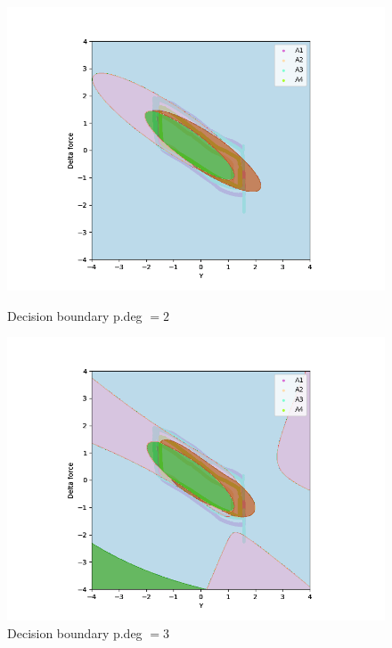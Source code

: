 \begin{figure}[]
\begin{minipage}[b]{0.5\linewidth}
                    \includegraphics[width = 1\textwidth]{figures/analysis/logistic_regression/Logistic_Regression_degree2.png}
                    \caption*{Decision boundary p.deg $= 2$}
                \end{minipage}
                \hfill
                \begin{minipage}[b]{0.5\linewidth}
                    \centering
                    \includegraphics[width = 1\textwidth]{figures/analysis/logistic_regression/Logistic_Regression_degree3.png}
                    \caption*{Decision boundary p.deg $= 3$}
                \end{minipage}
                \hfill
                \begin{minipage}[b]{0.5\linewidth}

\end{minipage}
\end{figure}
